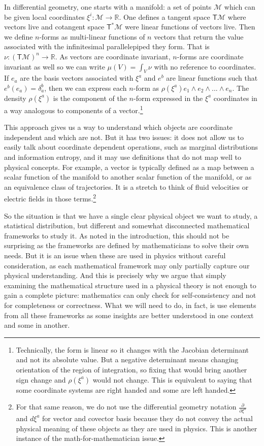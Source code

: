 \documentclass[11pt]{elsarticle}
\begin{document}
In differential geometry, one starts with a manifold: a set of points $\mathcal{M}$ which can be given local coordinates $\xi^i : \mathcal{M} \to \mathbb{R}$. One defines a tangent space $\mathsf{T}\mathcal{M}$ where vectors live and cotangent space $\mathsf{T}^*\mathcal{M}$ were linear functions of vectors live. Then we define $n$-forms as multi-linear functions of $n$ vectors that return the value associated with the infinitesimal parallelepiped they form. That is $\nu : (\mathsf{T}\mathcal{M})^n \rightarrow \mathbb{R}$. As vectors are coordinate invariant, $n$-forms are coordinate invariant as well so we can write $\mu(V)=\int_V \nu$ with no reference to coordinates. If $e_a$ are the basis vectors associated with $\xi^a$ and $e^b$ are linear functions such that $e^b(e_a)=\delta_a^b$, then we can express each $n$-form as $\rho(\xi^a)e_1\wedge e_2 \wedge ... \wedge e_n$. The density $\rho(\xi^a)$ is the component of the $n$-form expressed in the $\xi^a$ coordinates in a way analogous to components of a vector.\footnote{Technically, the form is linear so it changes with the Jacobian determinant and not its absolute value. But a negative determinant means changing orientation of the region of integration, so fixing that would bring another sign change and $\rho(\xi^a)$ would not change. This is equivalent to saying that some coordinate systems are right handed and some are left handed.}

This approach gives us a way to understand which objects are coordinate independent and which are not. But it has two issues: it does not allow us to easily talk about coordinate dependent operations, such as marginal distributions and information entropy, and it may use definitions that do not map well to physical concepts. For example, a vector is typically defined as a map between a scalar function of the manifold to another scalar function of the manifold, or as an equivalence class of trajectories. It is a stretch to think of fluid velocities or electric fields in those terms.\footnote{For that same reason, we do not use the differential geometry notation $\frac{\partial}{\partial \xi^a}$ and $d\xi^a$ for vector and covector basis because they do not convey the actual physical meaning of these objects as they are used in physics. This is another instance of the math-for-mathematician issue.}

So the situation is that we have a single clear physical object we want to study, a statistical distribution, but different and somewhat disconnected mathematical frameworks to study it. As noted in the introduction, this should not be surprising as the frameworks are defined by mathematicians to solve their own needs. But it is an issue when these are used in physics without careful consideration, as each mathematical framework may only partially capture our physical understanding. And this is precisely why we argue that simply examining the mathematical structure used in a physical theory is not enough to gain a complete picture: mathematics can only check for self-consistency and not for completeness or correctness. What we will need to do, in fact, is use elements from all these frameworks as some insights are better understood in one context and some in another.
\end{document}
